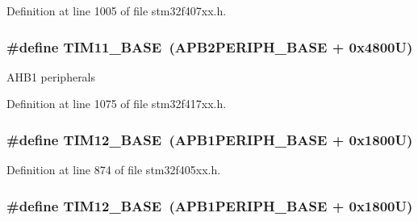 Definition at line 1005 of file stm32f407xx.\+h.

\subsubsection[{\texorpdfstring{T\+I\+M11\+\_\+\+B\+A\+SE}{TIM11_BASE}}]{\setlength{\rightskip}{0pt plus 5cm}\#define T\+I\+M11\+\_\+\+B\+A\+SE~({\bf A\+P\+B2\+P\+E\+R\+I\+P\+H\+\_\+\+B\+A\+SE} + 0x4800\+U)}\hypertarget{group___peripheral__registers__structures_ga3a4a06bb84c703084f0509e105ffaf1d}{}\label{group___peripheral__registers__structures_ga3a4a06bb84c703084f0509e105ffaf1d}
A\+H\+B1 peripherals 

Definition at line 1075 of file stm32f417xx.\+h.

\subsubsection[{\texorpdfstring{T\+I\+M12\+\_\+\+B\+A\+SE}{TIM12_BASE}}]{\setlength{\rightskip}{0pt plus 5cm}\#define T\+I\+M12\+\_\+\+B\+A\+SE~({\bf A\+P\+B1\+P\+E\+R\+I\+P\+H\+\_\+\+B\+A\+SE} + 0x1800\+U)}\hypertarget{group___peripheral__registers__structures_ga33dea32fadbaecea161c2ef7927992fd}{}\label{group___peripheral__registers__structures_ga33dea32fadbaecea161c2ef7927992fd}


Definition at line 874 of file stm32f405xx.\+h.

\subsubsection[{\texorpdfstring{T\+I\+M12\+\_\+\+B\+A\+SE}{TIM12_BASE}}]{\setlength{\rightskip}{0pt plus 5cm}\#define T\+I\+M12\+\_\+\+B\+A\+SE~({\bf A\+P\+B1\+P\+E\+R\+I\+P\+H\+\_\+\+B\+A\+SE} + 0x1800\+U)}\hypertarget{group___peripheral__registers__structures_ga33dea32fadbaecea161c2ef7927992fd}{}\label{group___peripheral__registers__structures_ga33dea32fadbaecea161c2ef7927992fd}


